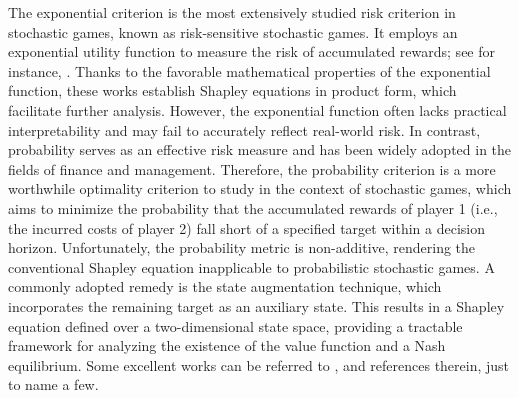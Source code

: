\documentclass[12pt]{article}
\begin{document}
The exponential criterion is the most extensively studied risk criterion in stochastic games, known as risk-sensitive stochastic games. It employs an exponential utility function to measure the risk of accumulated rewards; see for instance, \cite{bauerle2017zero, golui2022continuous,ghosh2023discrete,zhang2025zero, chen2025zero,bhatt2025risk}. Thanks to the favorable mathematical properties of the exponential function, these works establish Shapley equations in product form, which facilitate further analysis. However, the exponential function often lacks practical interpretability and may fail to accurately reflect real-world risk. In contrast, probability serves as an effective risk measure and has been widely adopted in the fields of finance and management. Therefore, the probability criterion is a more worthwhile optimality criterion to study in the context of stochastic games,  which aims to minimize the probability that the accumulated rewards
 of player 1 (i.e., the incurred costs of player 2) fall short of a specified target within a decision horizon. Unfortunately, the probability metric is non-additive, rendering the conventional Shapley equation inapplicable to probabilistic stochastic games.  A commonly adopted remedy is the state augmentation technique, which incorporates the remaining target as an auxiliary state. This results in a Shapley equation defined over a two-dimensional state space, providing a tractable framework for analyzing the existence of the value function and a Nash equilibrium. Some excellent works can be referred to \cite{huang2017probability,bhabak2021continuous,huang2022zero}, and references therein, just to name a few.
 
\end{document}
